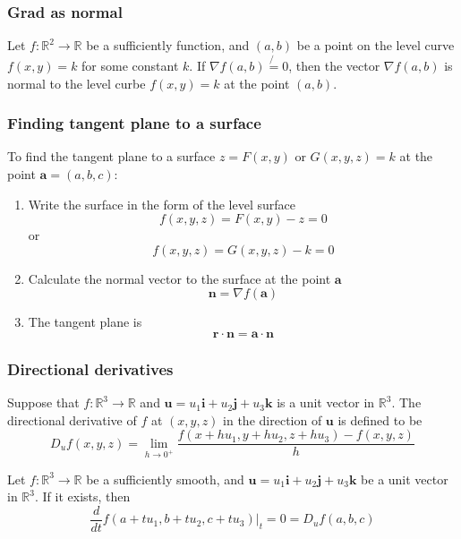 \documentclass[12pt]{article}
\begin{document}
		\subsubsection{Grad as normal}
		\begin{thm}
			Let $f:\mathbb{R}^2 \to \mathbb{R}$ be a sufficiently function, and $(a,b)$ be a point on the level curve $f(x,y)=k$ for some
			constant $k$. If $\nabla f (a,b) \not{=} 0$, then the vector $\nabla f (a,b)$ is normal to the level curbe $f(x,y)=k$ at the point $(a,b)$.
		\end{thm}
		
		\subsubsection{Finding tangent plane to a surface}
		To find the tangent plane to a surface $z=F(x,y)$ or $G(x,y,z)=k$ at the point $\mathbf{a} = (a,b,c)$:
		\begin{enumerate}
			\item Write the surface in the form of the level surface
				\[
					f(x,y,z) = F(x,y) - z = 0
				\]
				or
				\[
					f(x,y,z) = G(x,y,z) - k = 0
				\]
			\item Calculate the normal vector to the surface at the point $\mathbf{a}$
				\[
					\mathbf{n} = \nabla f ( \mathbf{a} )
				\]
			\item The tangent plane is
				\[
					\mathbf{r} \cdot \mathbf{n} = \mathbf{a} \cdot \mathbf{n}
				\]
		\end{enumerate}
		
		\subsubsection{Directional derivatives}
		\begin{defn}
			Suppose that $f:\mathbb{R}^3 \to \mathbb{R}$ and $\mathbf{u} = u_1 \mathbf{i} + u_2 \mathbf{j} + u_3 \mathbf{k}$ is a unit vector in $\mathbb{R}^3$.
			The directional derivative of $f$ at $(x,y,z)$ in the direction of $\mathbf{u}$ is defined to be
			\[
				D_u f(x,y,z) = \lim_{h \to 0^{+}} \frac{f(x+hu_1, y+hu_2, z+hu_3) - f(x,y,z)}{h}
			\]
		\end{defn}
		
		\begin{lemma}
			Let $f:\mathbb{R}^3 \to \mathbb{R}$ be a sufficiently smooth, and $\mathbf{u} = u_1 \mathbf{i} + u_2 \mathbf{j} + u_3 \mathbf{k}$ 
			be a unit vector in $\mathbb{R}^3$. If it exists, then
			\[
				\frac{d}{dt} f(a + tu_1, b + tu_2, c + tu_3) | _ t=0 = D_u f(a,b,c)
			\]
		\end{lemma}
		
\end{document}
